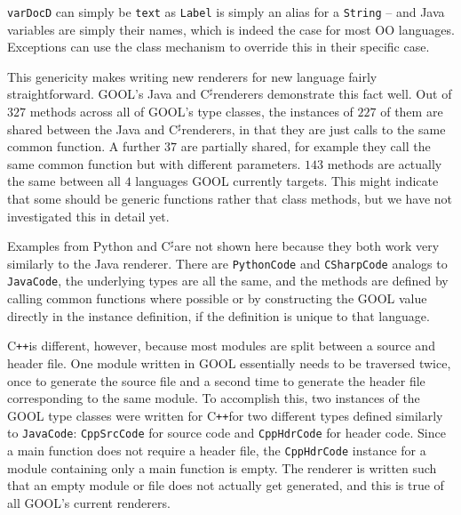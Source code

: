 \documentclass[sigplan,review,anonymous,prologue,dvipsnames]{acmart}
\newcommand{\Csharp}{C$^{\sharp}$}
\newcommand{\Cplusplus}{C\texttt{++}}
\begin{document}
\verb|varDocD| can simply be \verb|text| as \verb|Label| is simply an
alias for a \verb|String| -- and Java variables are simply their names,
which is indeed the case for most OO languages.  Exceptions can use the
class mechanism to override this in their specific case.

This genericity
makes writing new renderers for new language fairly straightforward.
GOOL's Java and \Csharp renderers demonstrate this fact well. Out of $327$
methods across all of GOOL's type classes, the instances of $227$ of them are
shared between the Java and \Csharp renderers, in that they are just calls to the
same common function. A further $37$ are partially shared, for example they call
the same common function but with different parameters. $143$ methods are
actually the same between all $4$ languages GOOL currently targets. This might
indicate that some should be generic functions rather that class methods,
but we have not investigated this in detail yet.

Examples from Python and \Csharp are not shown here because they both
work very similarly to the Java renderer. There are \verb|PythonCode| and
\verb|CSharpCode| analogs to \verb|JavaCode|, the underlying types are all the
same, and the methods are defined by calling common functions where possible
or by constructing the GOOL value directly in the instance definition, if the
definition is unique to that language.

\Cplusplus is different, however, because most modules are split between a source and
header file. One module written in GOOL essentially needs to be traversed
twice, once to generate the source file and a second time to generate the
header file corresponding to the same module. To accomplish this, two instances
of the GOOL type classes were written for \Cplusplus for two different types defined
similarly to \verb|JavaCode|: \verb|CppSrcCode| for source code and
\verb|CppHdrCode| for header code. Since a main function does not require a
header file, the \verb|CppHdrCode| instance for a module containing only a main
function is empty. The renderer is written such that an empty module or file
does not actually get generated, and this is true of all GOOL's current
renderers.
\end{document}
